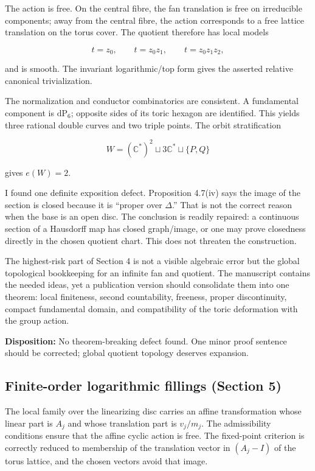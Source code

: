 \documentclass[
  10pt,
  letterpaper,
]{article}
\newcommand{\C}{\mathbb C}
\newcommand{\dP}{\mathrm{dP}}
\begin{document}
The action is free. On the central fibre, the fan translation is free on
irreducible components; away from the central fibre, the action
corresponds to a free lattice translation on the torus cover. The
quotient therefore has local models

\[
t=z_0,
\qquad t=z_0z_1,
\qquad t=z_0z_1z_2,
\]

and is smooth. The invariant logarithmic/top form gives the asserted
relative canonical trivialization.

The normalization and conductor combinatorics are consistent. A
fundamental component is \(\dP_6\); opposite sides of its toric hexagon
are identified. This yields three rational double curves and two triple
points. The orbit stratification

\[
W=(\C^*)^2\sqcup 3\C^*\sqcup\{P,Q\}
\]

gives \(e(W)=2\).

I found one definite exposition defect. Proposition 4.7(iv) says the
image of the section is closed because it is ``proper over \(\Delta\).''
That is not the correct reason when the base is an open disc. The
conclusion is readily repaired: a continuous section of a Hausdorff map
has closed graph/image, or one may prove closedness directly in the
chosen quotient chart. This does not threaten the construction.

The highest-risk part of Section 4 is not a visible algebraic error but
the global topological bookkeeping for an infinite fan and quotient. The
manuscript contains the needed ideas, yet a publication version should
consolidate them into one theorem: local finiteness, second
countability, freeness, proper discontinuity, compact fundamental
domain, and compatibility of the toric deformation with the group
action.

\textbf{Disposition:} No theorem-breaking defect found. One minor proof
sentence should be corrected; global quotient topology deserves
expansion.

\subsection{Finite-order logarithmic fillings (Section
5)}\label{finite-order-logarithmic-fillings-section-5}

The local family over the linearizing disc carries an affine
transformation whose linear part is \(A_j\) and whose translation part
is \(v_j/m_j\). The admissibility conditions ensure that the affine
cyclic action is free. The fixed-point criterion is correctly reduced to
membership of the translation vector in \((A_j-I)\) of the torus
lattice, and the chosen vectors avoid that image.
\end{document}
